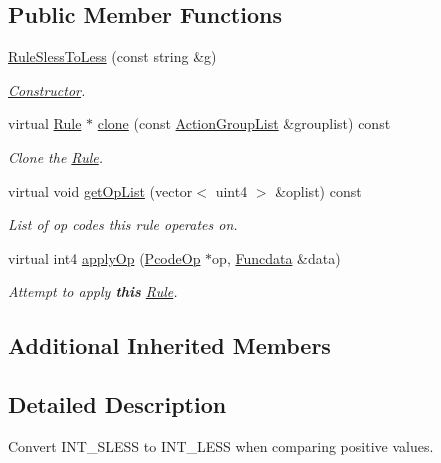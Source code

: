 \subsection*{Public Member Functions}
\begin{DoxyCompactItemize}
\item 
\mbox{\hyperlink{class_rule_sless_to_less_a95adf7839326388742dbfce8f4eb59d7}{Rule\+Sless\+To\+Less}} (const string \&g)
\begin{DoxyCompactList}\small\item\em \mbox{\hyperlink{class_constructor}{Constructor}}. \end{DoxyCompactList}\item 
virtual \mbox{\hyperlink{class_rule}{Rule}} $\ast$ \mbox{\hyperlink{class_rule_sless_to_less_a6d17357335c8beaa9c06daa55f9b7fc9}{clone}} (const \mbox{\hyperlink{class_action_group_list}{Action\+Group\+List}} \&grouplist) const
\begin{DoxyCompactList}\small\item\em Clone the \mbox{\hyperlink{class_rule}{Rule}}. \end{DoxyCompactList}\item 
virtual void \mbox{\hyperlink{class_rule_sless_to_less_acb3c7fb8478b129c45380af2aa987b24}{get\+Op\+List}} (vector$<$ uint4 $>$ \&oplist) const
\begin{DoxyCompactList}\small\item\em List of op codes this rule operates on. \end{DoxyCompactList}\item 
virtual int4 \mbox{\hyperlink{class_rule_sless_to_less_add6def135ebd895fd30990297c3dd280}{apply\+Op}} (\mbox{\hyperlink{class_pcode_op}{Pcode\+Op}} $\ast$op, \mbox{\hyperlink{class_funcdata}{Funcdata}} \&data)
\begin{DoxyCompactList}\small\item\em Attempt to apply {\bfseries{this}} \mbox{\hyperlink{class_rule}{Rule}}. \end{DoxyCompactList}\end{DoxyCompactItemize}
\subsection*{Additional Inherited Members}


\subsection{Detailed Description}
Convert I\+N\+T\+\_\+\+S\+L\+E\+SS to I\+N\+T\+\_\+\+L\+E\+SS when comparing positive values. 

